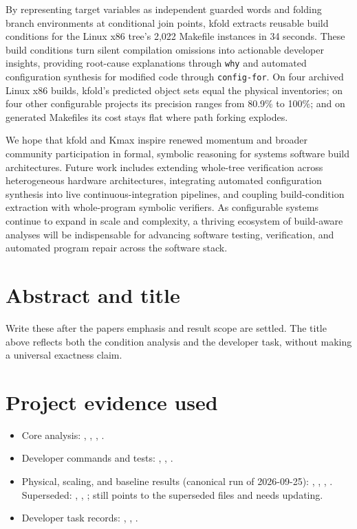 \documentclass[acmsmall]{acmart}
\newcommand{\tool}{\textsf{kfold}\xspace}
\newcommand{\kmax}{\textsf{Kmax}\xspace}
\providecommand{\tightlist}{\setlength{\itemsep}{0pt}\setlength{\parskip}{0pt}}
\begin{document}
By representing target variables as independent guarded words and folding branch environments at conditional join points, \tool extracts reusable build conditions for the Linux x86 tree's 2,022 Makefile instances in 34 seconds.
These build conditions turn silent compilation omissions into actionable developer insights, providing root-cause explanations through \texttt{why} and automated configuration synthesis for modified code through \texttt{config-for}.
On four archived Linux x86 builds, \tool's predicted object sets equal the physical inventories; on four other configurable projects its precision ranges from 80.9\% to 100\%; and on generated Makefiles its cost stays flat where path forking explodes.

We hope that \tool and \kmax inspire renewed momentum and broader community participation in formal, symbolic reasoning for systems software build architectures.
Future work includes extending whole-tree verification across heterogeneous hardware architectures, integrating automated configuration synthesis into live continuous-integration pipelines, and coupling build-condition extraction with whole-program symbolic verifiers.
As configurable systems continue to expand in scale and complexity, a thriving ecosystem of build-aware analyses will be indispensable for advancing software testing, verification, and automated program repair across the software stack.

\section*{Abstract and title}\label{abstract-and-title}

Write these after the paper\textquotesingle s emphasis and result scope are settled. The title above reflects both the condition analysis and the developer task, without making a universal exactness claim.

\section*{Project evidence used}\label{project-evidence-used}

\begin{itemize}
\tightlist
\item
  Core analysis: , , , .
\item
  Developer commands and tests: , , .
\item
  Physical, scaling, and baseline results (canonical run of 2026-09-25): , , , . Superseded: , , ;  still points to the superseded files and needs updating.
\item
  Developer task records: , , .
\end{itemize}



\end{document}
